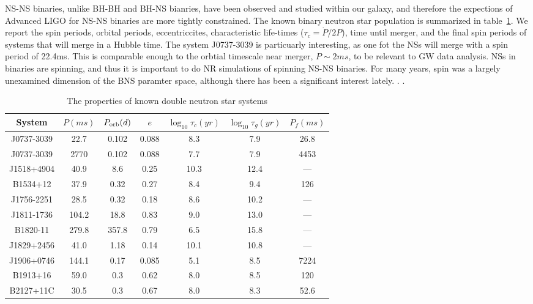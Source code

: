 NS-NS binaries, unlike BH-BH and BH-NS bianries, have been observed and studied within our galaxy, and therefore the expections of Advanced LIGO for NS-NS binaries are more tightly constrained. The known binary neutron star population is summarized in table~\ref{tab:BNSPop}. We report the spin periods, orbital periods, eccentriccites, characteristic life-times ($\tau_{c}=\dot{P}/2P$), time until merger, and the final spin periods of systems that will merge in a Hubble time. The system J0737-3039 is particuarly interesting, as one fot the NSs will merge with a spin period of 22.4ms. This is comparable enough to the orbtial timescale near merger, $P\sim 2ms$, to be relevant to GW data analysis. NSs in binaries are spinning, and thus it is important to do NR simulations of spinning NS-NS binaries. For many years, spin was a largely unexamined dimension of the BNS paramter space, although there has been a significant interest lately. . .

 
 \begin{table}
\centering
\label{tab:BNSPop}
 \caption{The properties of known double neutron star systems}
 \begin{tabular}{c || c | c | c | c | c | c}
 \hline
 System & $P(ms)$ & $P_{\textnormal{orb}}(d)$ & $e$ & $\log_{10}{\tau_c(yr)}$ & $\log_{10}{\tau_g(yr)}$ & $P_f(ms)$ \\
 \hline \hline
 J0737-3039 & 22.7 & 0.102 & 0.088 & 8.3 & 7.9 & 26.8 \\
 J0737-3039 &  2770 & 0.102 & 0.088 & 7.7 & 7.9 &   4453 \\
 J1518+4904 & 40.9 & 8.6 & 0.25 & 10.3 & 12.4 & --- \\
 B1534+12 & 37.9 & 0.32 & 0.27 & 8.4 & 9.4 & 126 \\
 J1756-2251 & 28.5 & 0.32 & 0.18 & 8.6 & 10.2 & --- \\
 J1811-1736 & 104.2 & 18.8 & 0.83 & 9.0 & 13.0 & --- \\
 B1820-11 & 279.8 & 357.8 & 0.79 & 6.5 & 15.8 & --- \\
 J1829+2456 & 41.0 & 1.18 & 0.14 & 10.1 & 10.8 & --- \\
 J1906+0746 & 144.1 & 0.17 & 0.085 & 5.1 & 8.5 & 7224 \\
 B1913+16 & 59.0 & 0.3 & 0.62 & 8.0 & 8.5 & 120 \\
 B2127+11C & 30.5 & 0.3 & 0.67 & 8.0 & 8.3 & 52.6 \\ 
 \end{tabular}
 \end{table}
 

